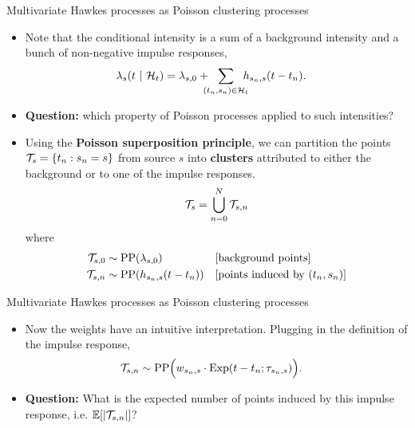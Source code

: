 \documentclass[aspectratio=169]{beamer}
\begin{document}
\begin{frame}[t]{Multivariate Hawkes processes as Poisson clustering processes}
    \begin{itemize}
        \itemsep1em
        
        \item Note that the conditional intensity is a sum of a background intensity and a bunch of non-negative impulse responses,
        \begin{align}
            \lambda_s(t \mid \cH_t) &= \lambda_{s,0} + \!\!\!\!\sum_{(t_n, s_n) \in \cH_t}\!\!\!\! h_{s_n, s}(t - t_n).
        \end{align}
        
        \item \textbf{Question:} which property of Poisson processes applied to such intensities?
        
        \item Using the \textbf{Poisson superposition principle}, we can partition the points $\mathcal{T}_s = \{t_n: s_n=s\}$ from source $s$ into \textbf{clusters} attributed to either the background or to one of the impulse responses.
        \begin{align}
            \mathcal{T}_s = \bigcup_{n=0}^N \mathcal{T}_{s,n}
        \end{align} 
        where
        \begin{align}
            \mathcal{T}_{s,0} &\sim \mathrm{PP}(\lambda_{s,0}) & & \text{[background points]}\\ 
            \mathcal{T}_{s,n} &\sim \mathrm{PP}(h_{s_n,s}(t - t_n)) & & \text{[points induced by $(t_n, s_n)$]}
        \end{align}
    \end{itemize}
\end{frame}

\begin{frame}[t]{Multivariate Hawkes processes as Poisson clustering processes}
    \begin{itemize}
        \itemsep1em
        
        \item Now the weights have an intuitive interpretation. Plugging in the definition of the impulse response,
        \begin{align}
            \mathcal{T}_{s,n} &\sim \mathrm{PP}\Big(w_{s_n,s} \cdot \mathrm{Exp}(t - t_n; \tau_{s_n,s}) \Big).
        \end{align}
        \item \textbf{Question:} What is the expected number of points induced by this impulse response, i.e. $\mathbb{E}[|\mathcal{T}_{s,n}|]$?
    \end{itemize}
\end{frame}
\end{document}
